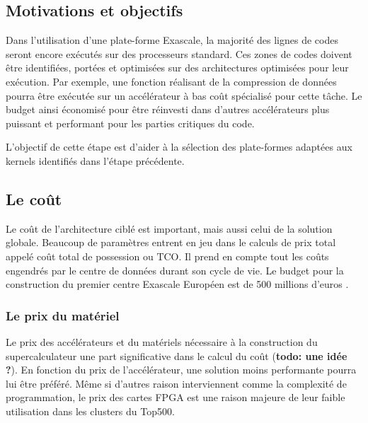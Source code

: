 \subsection{Motivations et objectifs}


Dans l'utilisation d'une plate-forme Exascale, la majorité des lignes de codes seront encore exécutés sur des processeurs standard. Ces zones de codes doivent être identifiées, portées et optimisées sur des architectures optimisées pour leur exécution. Par exemple, une fonction réalisant de la compression de données pourra être exécutée sur un accélérateur à bas coût spécialisé pour cette tâche. Le budget ainsi économisé pour être réinvesti dans d'autres accélérateurs plus puissant et performant pour les parties critiques du code. 

L'objectif de cette étape est d'aider à la sélection des plate-formes adaptées aux kernels identifiés dans l'étape précédente.


\subsection{Le coût}

Le coût de l'architecture ciblé est important, mais aussi celui de la solution globale. Beaucoup de paramètres entrent en jeu dans le calculs de prix total appelé coût total de possession ou $\text{TCO}$. Il prend en compte tout les coûts engendrés par le centre de données durant son cycle de vie. Le budget pour la construction du premier centre Exascale Européen est de 500 millions d'euros \cite{SergiGirona2018}.

\subsubsection{Le prix du matériel} 
Le  prix des accélérateurs et du matériels nécessaire à la construction du supercalculateur une part significative dans le calcul du coût (\textbf{todo: une idée ?}). En fonction du prix de l'accélérateur, une solution moins performante pourra lui être préféré. Même si d'autres raison interviennent comme la complexité de programmation, le prix des cartes FPGA est une raison majeure de leur faible utilisation dans les clusters du Top500.

